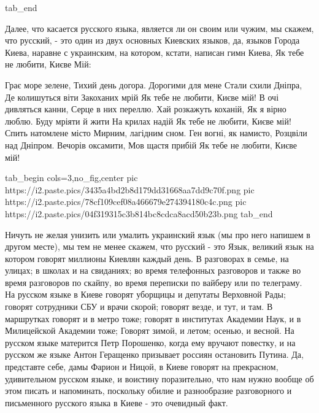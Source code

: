 tab_end
\fi

Далее, что касается русского языка, является ли он своим или чужим, мы скажем,
что русский, - это один из двух основных Киевских языков, да, языков Города
Киева, наравне с украинским, на котором, кстати, написан гимн Киева, Як тебе не
любити, Києве Мій:

\raggedcolumns
\begin{multicols}{3} %
\setlength{\parindent}{0pt}
\obeycr
Грає море зелене,
Тихий день догора.
Дорогими для мене
Стали схили Дніпра,
Де колишуться віти
Закоханих мрій
Як тебе не любити,
Києве мій!
\smallskip
В очі дивляться канни,
Серце в них переллю.
Хай розкажуть коханій,
Як я вірно люблю.
Буду мріяти й жити
На крилах надій
Як тебе не любити,
Києве мій!
\smallskip
Спить натомлене місто
Мирним, лагідним сном.
Ген вогні, як намисто,
Розцвіли над Дніпром.
Вечорів оксамити,
Мов щастя прибій
Як тебе не любити,
Києве мій!
\restorecr
\end{multicols} %

\ifcmt
  tab_begin cols=3,no_fig,center
     pic https://i2.paste.pics/3435a4bd2b8d179dd31668aa7dd9c70f.png
     pic https://i2.paste.pics/78cf109cef08a466679e274394180c4c.png 
     pic https://i2.paste.pics/04f319315c3b814bc8cdca8acd50b23b.png
  tab_end
\fi

Ничуть не желая унизить или умалить украинский язык (мы про
него напишем в другом месте), мы тем не менее скажем, что русский - это Язык,
великий язык на котором говорят миллионы Киевлян каждый день. В разговорах в
семье, на улицах; в школах и на свиданиях; во время телефонных разговоров и
также во время разговоров по скайпу, во время переписки по вайберу или по
телеграму. На русском языке в Киеве говорят уборщицы и депутаты Верховной Рады;
говорят сотрудники СБУ и врачи скорой; говорят везде, и тут, и там. В
маршрутках говорят и в метро тоже; говорят в институтах Академии Наук, и в
Милицейской Академии тоже; Говорят зимой, и летом; осенью, и весной. На русском
языке матерится Петр Порошенко, когда ему вручают повестку, и на русском же
языке Антон Геращенко призывает россиян остановить Путина. Да, представте себе,
дамы Фарион и Ницой, в Киеве говорят на прекрасном, удивительном русском языке,
и воистину поразительно, что нам нужно вообще об этом писать и напоминать,
поскольку обилие и разнообразие разговорного и письменного русского языка в
Киеве - это очевидный факт. 


